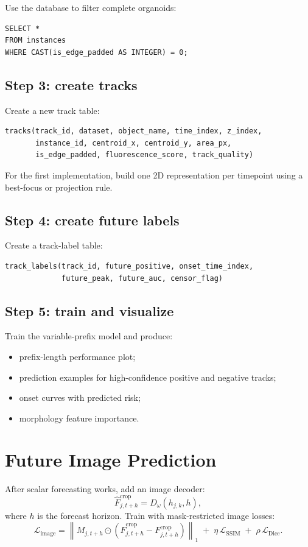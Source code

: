 \documentclass[11pt]{article}
\newcommand{\1}{\mathbf{1}}
\begin{document}
Use the database to filter complete organoids:
\begin{verbatim}
SELECT *
FROM instances
WHERE CAST(is_edge_padded AS INTEGER) = 0;
\end{verbatim}

\subsection{Step 3: create tracks}
Create a new track table:
\begin{verbatim}
tracks(track_id, dataset, object_name, time_index, z_index,
       instance_id, centroid_x, centroid_y, area_px,
       is_edge_padded, fluorescence_score, track_quality)
\end{verbatim}

For the first implementation, build one 2D representation per timepoint using a best-focus or projection rule.

\subsection{Step 4: create future labels}
Create a track-label table:
\begin{verbatim}
track_labels(track_id, future_positive, onset_time_index,
             future_peak, future_auc, censor_flag)
\end{verbatim}

\subsection{Step 5: train and visualize}
Train the variable-prefix model and produce:
\begin{itemize}[leftmargin=1.5em]
  \item prefix-length performance plot;
  \item prediction examples for high-confidence positive and negative tracks;
  \item onset curves with predicted risk;
  \item morphology feature importance.
\end{itemize}

\section{Future Image Prediction}
After scalar forecasting works, add an image decoder:
\begin{equation}
\hat{F}_{j,t+h}^{\mathrm{crop}}
=
D_\omega(h_{j,k}, h),
\end{equation}
where \(h\) is the forecast horizon. Train with mask-restricted image losses:
\begin{equation}
\mathcal{L}_{\mathrm{image}}
=
\left\|M_{j,t+h}\odot
\left(\hat{F}_{j,t+h}^{\mathrm{crop}}-F_{j,t+h}^{\mathrm{crop}}\right)
\right\|_1
\;+\;
\eta\,\mathcal{L}_{\mathrm{SSIM}}
\;+\;
\rho\,\mathcal{L}_{\mathrm{Dice}}.
\end{equation}
\end{document}
